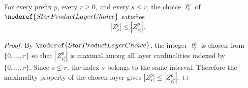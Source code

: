 \begin{lemma}
For every prefix \(p\), every \(r\ge0\), and every \(s\le r\), the
choice \(\ell_r^p\) of \(\noderef{StarProductLayerChoice}\) satisfies
\[
  |Z_s^p|\le |Z_{\ell_r^p}^p|.
\]
\end{lemma}
\begin{proof}
By \(\noderef{StarProductLayerChoice}\), the integer \(\ell_r^p\) is chosen
from \(\{0,\ldots,r\}\) so that \(|Z_{\ell_r^p}^p|\) is maximal among all
layer cardinalities indexed by \(\{0,\ldots,r\}\).  Since \(s\le r\), the
index \(s\) belongs to the same interval.  Therefore the maximality property
of the chosen layer gives \(|Z_s^p|\le |Z_{\ell_r^p}^p|\).
\end{proof}
